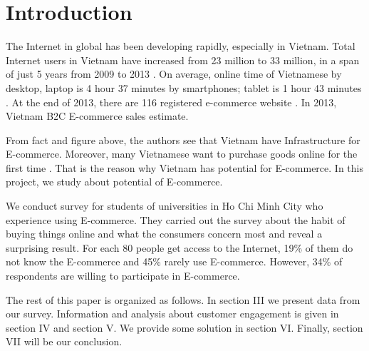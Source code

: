 \documentclass[conference]{IEEEtran}
\begin{document}
\section{Introduction}
The Internet in global has been developing rapidly, especially in Vietnam. Total Internet users in Vietnam have increased from 23 million to 33 million, in a span of just 5 years from 2009 to 2013 \cite{InfoAndData2014}. On average, online time of Vietnamese by desktop, laptop is 4 hour 37 minutes by smartphones; tablet is 1 hour 43 minutes \cite{VietnamMobile2014}. At the end of 2013, there are 116 registered e-commerce website \cite{VietnamMobile2013}. In 2013, Vietnam B2C E-commerce sales estimate. \cite{vecita}



From fact and figure above, the authors see that Vietnam have Infrastructure for E-commerce. Moreover, many Vietnamese want to purchase goods online for the first time \cite{GoogleStudy2013}. That is the reason why Vietnam has potential for E-commerce. In this project, we study about potential of E-commerce.

We conduct survey for students of universities in Ho Chi Minh City who experience using E-commerce. They carried out the survey about the habit of buying things online and what the consumers concern most and reveal a surprising result. For each 80 people get access to the Internet, 19\% of them do not know the E-commerce and 45\% rarely use E-commerce. However, 34\% of respondents are willing to participate in E-commerce.

The rest of this paper is organized as follows. In section III we present data from our survey. Information and analysis about customer engagement is given in section IV and section V. We provide some solution in section VI. Finally, section VII will be our conclusion.




\end{document}
